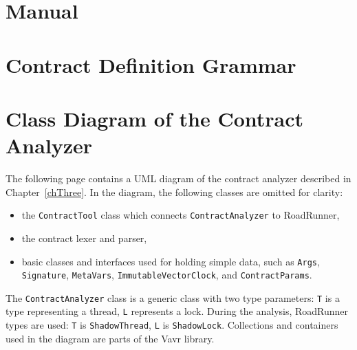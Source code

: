 \chapter{Manual}
\label{manual}


\chapter{Contract Definition Grammar}
\label{appGrammar}


\chapter{Class Diagram of the Contract Analyzer}
\label{diagram}

The following page contains a UML diagram of the contract analyzer described in
Chapter~\ref{chThree}. In the diagram, the following classes are omitted for
clarity:
\begin{itemize}
    \item the \texttt{ContractTool} class which connects
    \texttt{ContractAnalyzer} to RoadRunner,
    \item the contract lexer and parser,
    \item basic classes and interfaces used for holding simple data, such as
    \texttt{Args}, \texttt{Signature}, \texttt{MetaVars},
    \texttt{ImmutableVectorClock}, and \texttt{ContractParams}.
\end{itemize}

The \texttt{ContractAnalyzer} class is a generic class with two type parameters:
\texttt{T} is a type representing a thread, \texttt{L} represents a lock. During
the analysis, RoadRunner types are used: \texttt{T} is \texttt{ShadowThread},
\texttt{L} is \texttt{ShadowLock}. Collections and containers used in the
diagram are parts of the Vavr library.

\pagebreak


